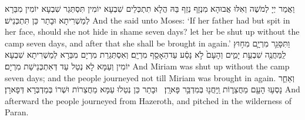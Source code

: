 {וַאֲמַר יְיָ לְמֹשֶׁה וְאִלּוּ אֲבוּהָא מִנְזָף נְזַף בַּהּ הֲלָא תִתְכְּלֵים שִׁבְעָא יוֹמִין תִּסְתְּגַר שִׁבְעָא יוֹמִין מִבַּרָא לְמַשְׁרִיתָא וּבָתַר כֵּן תִּתְכְּנֵישׁ׃}
{And the \lord\space said unto Moses: ‘If her father had but spit in her face, should she not hide in shame seven days? let her be shut up without the camp seven days, and after that she shall be brought in again.’}{}
{וַתִּסָּגֵ֥ר מִרְיָ֛ם מִח֥וּץ לַֽמַּחֲנֶ֖ה שִׁבְעַ֣ת יָמִ֑ים וְהָעָם֙ לֹ֣א נָסַ֔ע עַד\maqqaf הֵאָסֵ֖ף מִרְיָֽם׃}
{וְאִסְתְּגַרַת מִרְיָם מִבַּרָא לְמַשְׁרִיתָא שִׁבְעָא יוֹמִין וְעַמָּא לָא נְטַל עַד דְּאִתְכְּנֵישַׁת מִרְיָם׃}
{And Miriam was shut up without the camp seven days; and the people journeyed not till Miriam was brought in again.}{}
{וְאַחַ֛ר נָסְע֥וּ הָעָ֖ם מֵחֲצֵר֑וֹת וַֽיַּחֲנ֖וּ בְּמִדְבַּ֥ר פָּארָֽן׃ \petucha }
{וּבָתַר כֵּן נְטַלוּ עַמָּא מֵחֲצֵרוֹת וּשְׁרוֹ בְּמַדְבְּרָא דְּפָארָן׃}
{And afterward the people journeyed from Hazeroth, and pitched in the wilderness of Paran.}{}

